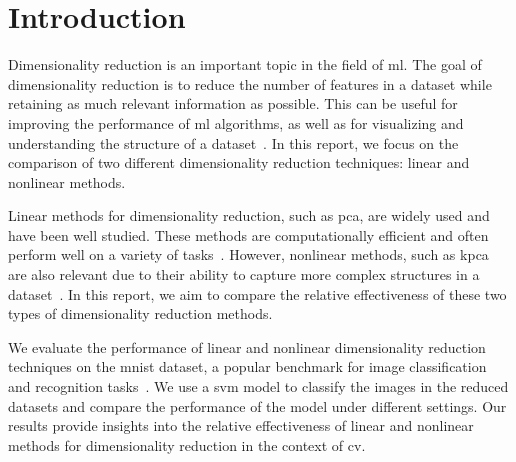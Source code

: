 \chapter{Introduction}\label{cha:introduction}




Dimensionality reduction is an important topic in the field of \gls{ml}. The goal of dimensionality reduction is to reduce the number of features in a dataset while retaining as much relevant information as possible. This can be useful for improving the performance of \gls{ml} algorithms, as well as for visualizing and understanding the structure of a dataset~\cite{dimensionality-reduction-cheng}. In this report, we focus on the comparison of two different dimensionality reduction techniques: linear and nonlinear methods.

Linear methods for dimensionality reduction, such as \gls{pca}, are widely used and have been well studied. These methods are computationally efficient and often perform well on a variety of tasks~\cite{james-statistical-learning1}. However, nonlinear methods, such as \gls{kpca} are also relevant due to their ability to capture more complex structures in a dataset~\cite{dimensionality-reduction-cheng}. In this report, we aim to compare the relative effectiveness of these two types of dimensionality reduction methods.

We evaluate the performance of linear and nonlinear dimensionality reduction techniques on the \gls{mnist} dataset, a popular benchmark for image classification and recognition tasks~\cite{lecun-mnist-database}. We use a \gls{svm} model to classify the images in the reduced datasets and compare the performance of the model under different settings. Our results provide insights into the relative effectiveness of linear and nonlinear methods for dimensionality reduction in the context of \gls{cv}.

